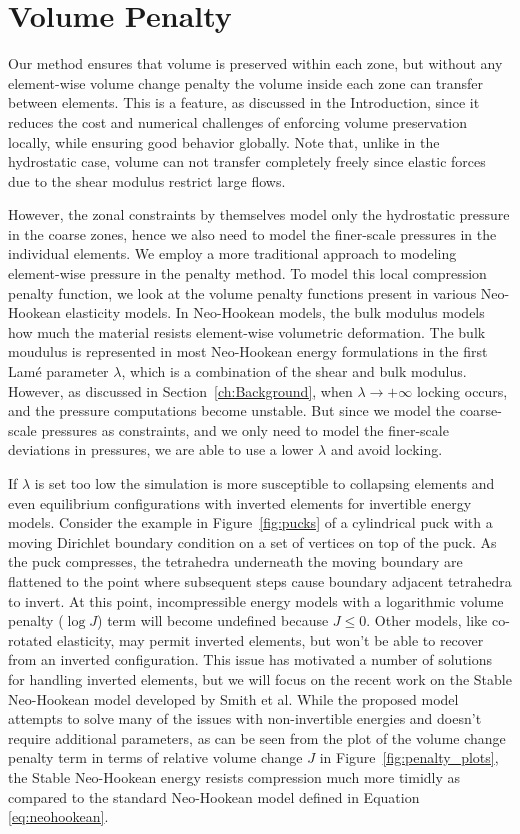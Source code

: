 \chapter{Volume Penalty}
\label{ch:Volume Penalty}

Our method ensures that volume is preserved within each zone, but without any element-wise volume
change penalty the volume inside each zone can transfer between elements. This is a feature, as discussed in the Introduction, since
it reduces the cost and numerical challenges of enforcing volume preservation locally, while
ensuring good behavior globally.  Note that, unlike in the hydrostatic case, volume can not transfer
completely freely since elastic forces due to the shear modulus restrict large flows. 


However, the zonal constraints by themselves model only the hydrostatic pressure in the coarse zones, hence we also need to model the finer-scale pressures in the individual elements.
We employ a more traditional approach to modeling element-wise pressure in the penalty method.
To model this local compression penalty function, we look at the volume penalty functions present in various Neo-Hookean elasticity models.
In Neo-Hookean models, the bulk modulus models how much the material resists element-wise volumetric deformation. 
The bulk moudulus is represented in most Neo-Hookean energy formulations in the first Lam\'e parameter $\lambda$, which is a combination of the shear and bulk modulus.
However, as discussed in Section~\ref{ch:Background}, when $\lambda \rightarrow +\infty$ locking occurs, and the pressure computations become unstable.
But since we model the coarse-scale pressures as constraints, and we only need to model the finer-scale deviations in pressures, we are able to use a lower $\lambda$ and avoid locking.


If $\lambda$ is set too low the simulation is more susceptible to collapsing elements 
and even equilibrium configurations with inverted elements for invertible energy models.
Consider the example in Figure~\ref{fig:pucks} of a cylindrical puck with a moving Dirichlet
boundary condition on a set of vertices on top of the puck. As the puck compresses, the tetrahedra
underneath the moving boundary are flattened to the point where subsequent steps cause boundary
adjacent tetrahedra to invert. At this point, incompressible energy models with a logarithmic volume
penalty ($\log J$) term will become undefined because $J \leq 0$. Other models, like co-rotated
elasticity, may permit inverted elements, but won't be able to recover from an inverted
configuration. This issue has motivated a number of solutions \cite{Irving:2004,Smith:2018} for
handling inverted elements, but we will focus on the recent work on the Stable Neo-Hookean
model developed by Smith et al. While the proposed model attempts to solve many of the issues with
non-invertible energies and doesn't require additional parameters, as can be seen from the plot
of the volume change penalty term in terms of relative volume change $J$ in Figure~\ref{fig:penalty_plots},
the Stable Neo-Hookean energy resists compression much more timidly as compared to
the standard Neo-Hookean model defined in Equation \eqref{eq:neohookean}.

